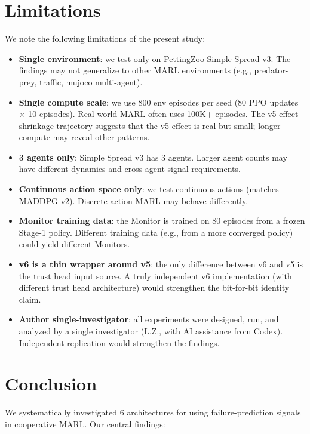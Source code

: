 \documentclass[11pt]{article}
\begin{document}
\section{Limitations}

We note the following limitations of the present study:

\begin{itemize}
  \item \textbf{Single environment}: we test only on PettingZoo
        Simple Spread v3. The findings may not generalize to other
        MARL environments (e.g., predator-prey, traffic, mujoco
        multi-agent).
  \item \textbf{Single compute scale}: we use 800 env episodes per
        seed (80 PPO updates $\times$ 10 episodes). Real-world MARL
        often uses 100K+ episodes. The v5 effect-shrinkage
        trajectory suggests that the v5 effect is real but small;
        longer compute may reveal other patterns.
  \item \textbf{3 agents only}: Simple Spread v3 has 3 agents.
        Larger agent counts may have different dynamics and
        cross-agent signal requirements.
  \item \textbf{Continuous action space only}: we test continuous
        actions (matches MADDPG v2). Discrete-action MARL may
        behave differently.
  \item \textbf{Monitor training data}: the Monitor is trained on
        80 episodes from a frozen Stage-1 policy. Different
        training data (e.g., from a more converged policy) could
        yield different Monitors.
  \item \textbf{v6 is a thin wrapper around v5}: the only
        difference between v6 and v5 is the trust head input
        source. A truly independent v6 implementation (with
        different trust head architecture) would strengthen the
        bit-for-bit identity claim.
  \item \textbf{Author single-investigator}: all experiments were
        designed, run, and analyzed by a single investigator (L.Z.,
        with AI assistance from Codex). Independent replication
        would strengthen the findings.
\end{itemize}

\section{Conclusion}

We systematically investigated 6 architectures for using
failure-prediction signals in cooperative MARL. Our central
findings:
\end{document}

